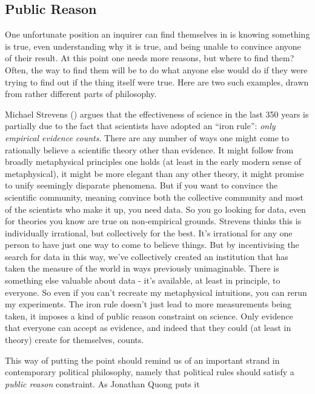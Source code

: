 \documentclass[
  12pt,
  letterpaper,
]{scrbook}
\begin{document}
\subsection{Public Reason}\label{sec-rawlsinquiry}

One unfortunate position an inquirer can find themselves in is knowing
something is true, even understanding why it is true, and being unable
to convince anyone of their result. At this point one needs more
reasons, but where to find them? Often, the way to find them will be to
do what anyone else would do if they were trying to find out if the
thing itself were true. Here are two such examples, drawn from rather
different parts of philosophy.

Michael Strevens () argues that the
effectiveness of science in the last 350 years is partially due to the
fact that scientists have adopted an ``iron rule'': \emph{only empirical
evidence counts}. There are any number of ways one might come to
rationally believe a scientific theory other than evidence. It might
follow from broadly metaphysical principles one holds (at least in the
early modern sense of metaphysical), it might be more elegant than any
other theory, it might promise to unify seemingly disparate phenomena.
But if you want to convince the scientific community, meaning convince
both the collective community and most of the scientists who make it up,
you need data. So you go looking for data, even for theories you know
are true on non-empirical grounds. Strevens thinks this is individually
irrational, but collectively for the best. It's irrational for any one
person to have just one way to come to believe things. But by
incentivising the search for data in this way, we've collectively
created an institution that has taken the measure of the world in ways
previously unimaginable. There is something else valuable about data -
it's available, at least in principle, to everyone. So even if you can't
recreate my metaphysical intuitions, you can rerun my experiments. The
iron rule doesn't just lead to more measurements being taken, it imposes
a kind of public reason constraint on science. Only evidence that
everyone can accept as evidence, and indeed that they could (at least in
theory) create for themselves, counts.

This way of putting the point should remind us of an important strand in
contemporary political philosophy, namely that political rules should
satisfy a \emph{public reason} constraint. As Jonathan Quong puts it
\end{document}

